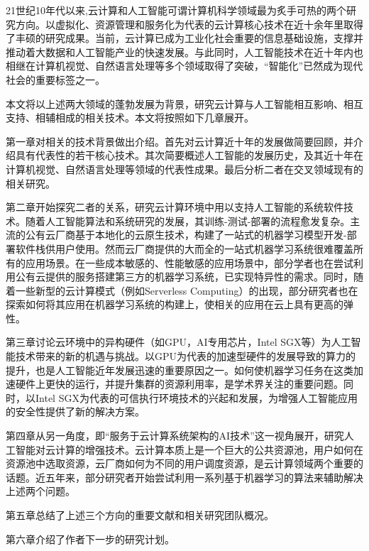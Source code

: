 
\begin{cabstract}
	21世纪10年代以来,云计算和人工智能可谓计算机科学领域最为炙手可热的两个研究方向。以虚拟化、资源管理和服务化为代表的云计算核心技术在近十余年里取得了丰硕的研究成果。当前，云计算已成为工业化社会重要的信息基础设施，支撑并推动着大数据和人工智能产业的快速发展。与此同时，人工智能技术在近十年内也相继在计算机视觉、自然语言处理等多个领域取得了突破，“智能化”已然成为现代社会的重要标签之一。
	
	本文将以上述两大领域的蓬勃发展为背景，研究云计算与人工智能相互影响、相互支持、相辅相成的相关技术。本文将按照如下几章展开。
	
	第一章对相关的技术背景做出介绍。首先对云计算近十年的发展做简要回顾，并介绍具有代表性的若干核心技术。其次简要概述人工智能的发展历史，及其近十年在计算机视觉、自然语言处理等领域的代表性成果。最后分析二者在交叉领域现有的相关研究。
	
	第二章开始探究二者的关系，研究云计算环境中用以支持人工智能的系统软件技术。随着人工智能算法和系统研究的发展，其训练-测试-部署的流程愈发复杂。主流的公有云厂商基于本地化的云原生技术，构建了一站式的机器学习模型开发-部署软件栈供用户使用。然而云厂商提供的大而全的一站式机器学习系统很难覆盖所有的应用场景。在一些成本敏感的、性能敏感的应用场景中，部分学者也在尝试利用公有云提供的服务搭建第三方的机器学习系统，已实现特异性的需求。同时，随着一些新型的云计算模式（例如Serverless Computing）的出现，部分研究者也在探索如何将其应用在机器学习系统的构建上，使相关的应用在云上具有更高的弹性。

	第三章讨论云环境中的异构硬件（如GPU，AI专用芯片，Intel SGX等）为人工智能技术带来的新的机遇与挑战。以GPU为代表的加速型硬件的发展导致的算力的提升，也是人工智能近年发展迅速的重要原因之一。如何使机器学习任务在这类加速硬件上更快的运行，并提升集群的资源利用率，是学术界关注的重要问题。同时，以Intel SGX为代表的可信执行环境技术的兴起和发展，为增强人工智能应用的安全性提供了新的解决方案。

	第四章从另一角度，即“服务于云计算系统架构的AI技术”这一视角展开，研究人工智能对云计算的增强技术。云计算本质上是一个巨大的公共资源池，用户如何在资源池中选取资源，云厂商如何为不同的用户调度资源，是云计算领域两个重要的话题。近五年来，部分研究者开始尝试利用一系列基于机器学习的算法来辅助解决上述两个问题。
	
	第五章总结了上述三个方向的重要文献和相关研究团队概况。
	
	第六章介绍了作者下一步的研究计划。

\end{cabstract}


